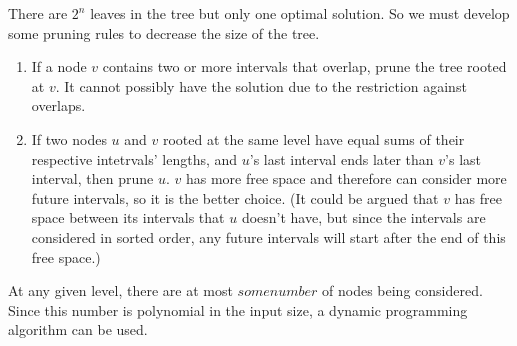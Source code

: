 \documentclass[letterpaper,notitlepage,twoside]{article}
\begin{document}
There are $2^n$ leaves in the tree but only one optimal solution. So we must develop some pruning rules to decrease the size of the tree.
\begin{enumerate}
\item If a node $v$ contains two or more intervals that overlap, prune the tree rooted at $v$. It cannot possibly have the solution due to the restriction against overlaps.
\item If two nodes $u$ and $v$ rooted at the same level have equal sums of their respective intetrvals' lengths, and $u$'s last interval ends later than $v$'s last interval, then prune $u$. $v$ has more free space and therefore can consider more future intervals, so it is the better choice. (It could be argued that $v$ has free space between its intervals that $u$ doesn't have, but since the intervals are considered in sorted order, any future intervals will start after the end of this free space.) 
\end{enumerate}

At any given level, there are at most $some number$ of nodes being considered. Since this number is polynomial in the input size, a dynamic programming algorithm can be used.
\end{document}
